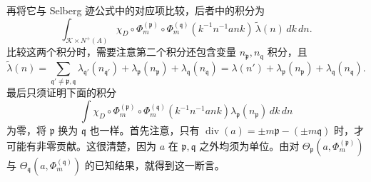 再将它与 Selberg 迹公式中的对应项比较，后者中的积分为
\[
\int_{\mathcal K\times N^+(A)}
\chi_D\circ\Phi_m^{(\mathfrak p)}\circ\Phi_m^{(\mathfrak q)}
(k^{-1}n^{-1}ank)\,\widetilde\lambda(n)\,dk\,dn.
\]
比较这两个积分时，需要注意第二个积分还包含变量 $n_{\mathfrak p},n_{\mathfrak q}$ 积分，且
\[
\widetilde\lambda(n)=
\sum_{\mathfrak q'\ne\mathfrak p,\mathfrak q}\lambda_{\mathfrak q'}(n_{\mathfrak q'})
+\lambda_{\mathfrak p}(n_{\mathfrak p})+\lambda_{\mathfrak q}(n_{\mathfrak q})
=\lambda(n')+\lambda_{\mathfrak p}(n_{\mathfrak p})+\lambda_{\mathfrak q}(n_{\mathfrak q}).
\]
最后只须证明下面的积分
\[
\int\chi_D\circ\Phi_m^{(\mathfrak p)}\circ\Phi_m^{(\mathfrak q)}
(k^{-1}n^{-1}ank)\lambda_{\mathfrak p}(n_{\mathfrak p})\,dk\,dn
\]
为零，将 $\mathfrak p$ 换为 $\mathfrak q$ 也一样。首先注意，只有
$\operatorname{div}(a)=\pm m\mathfrak p-(\pm m\mathfrak q)$ 时，才可能有非零贡献。这很清楚，因为 $a$ 在 $\mathfrak p,\mathfrak q$ 之外均须为单位。由对
$\Theta_{\mathfrak p}(a,\Phi_m^{(\mathfrak p)})$ 与
$\Theta_{\mathfrak q}(a,\Phi_m^{(\mathfrak q)})$ 的已知结果，就得到这一断言。

